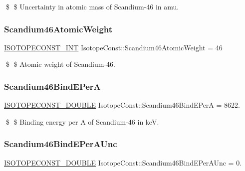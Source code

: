 \$ \$ Uncertainty in atomic mass of Scandium-\/46 in amu. \mbox{\label{group___isotope_const-_scandium-_sc46_ga61dd4f0a4a85cc45bbbdcb1a48b4b4ad}} 
\subsubsection{\texorpdfstring{Scandium46\+Atomic\+Weight}{Scandium46AtomicWeight}}
{\footnotesize\ttfamily \mbox{\hyperlink{group___isotope_const-_macros_ga5f18360b3e99483a35c32d789e62621c}{I\+S\+O\+T\+O\+P\+E\+C\+O\+N\+S\+T\+\_\+\+I\+NT}} Isotope\+Const\+::\+Scandium46\+Atomic\+Weight = 46}

\$ \$ Atomic weight of Scandium-\/46. \mbox{\label{group___isotope_const-_scandium-_sc46_gac576c73972098c4103d93b0598c827c6}} 
\subsubsection{\texorpdfstring{Scandium46\+Bind\+E\+PerA}{Scandium46BindEPerA}}
{\footnotesize\ttfamily \mbox{\hyperlink{group___isotope_const-_macros_ga8f45a7272ce02c0b4c65c44636ed719a}{I\+S\+O\+T\+O\+P\+E\+C\+O\+N\+S\+T\+\_\+\+D\+O\+U\+B\+LE}} Isotope\+Const\+::\+Scandium46\+Bind\+E\+PerA = 8622.}

\$ \$ Binding energy per A of Scandium-\/46 in keV. \mbox{\label{group___isotope_const-_scandium-_sc46_ga414180c3e41334324b9815ca166dc636}} 
\subsubsection{\texorpdfstring{Scandium46\+Bind\+E\+Per\+A\+Unc}{Scandium46BindEPerAUnc}}
{\footnotesize\ttfamily \mbox{\hyperlink{group___isotope_const-_macros_ga8f45a7272ce02c0b4c65c44636ed719a}{I\+S\+O\+T\+O\+P\+E\+C\+O\+N\+S\+T\+\_\+\+D\+O\+U\+B\+LE}} Isotope\+Const\+::\+Scandium46\+Bind\+E\+Per\+A\+Unc = 0.}

